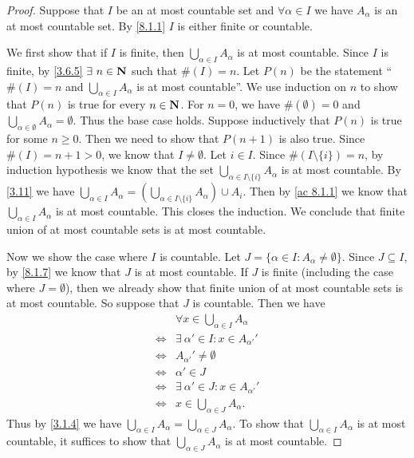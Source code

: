 \begin{proof}
  Suppose that \(I\) be an at most countable set and \(\forall \alpha \in I\) we have \(A_{\alpha}\) is an at most countable set.
  By \cref{8.1.1} \(I\) is either finite or countable.

  We first show that if \(I\) is finite, then \(\bigcup_{\alpha \in I} A_{\alpha}\) is at most countable.
  Since \(I\) is finite, by \cref{3.6.5} \(\exists\ n \in \mathbf{N}\) such that \(\#(I) = n\).
  Let \(P(n)\) be the statement ``\(\#(I) = n\) and \(\bigcup_{\alpha \in I} A_{\alpha}\) is at most countable''.
  We use induction on \(n\) to show that \(P(n)\) is true for every \(n \in \mathbf{N}\).
  For \(n = 0\), we have \(\#(\emptyset) = 0\) and \(\bigcup_{\alpha \in \emptyset} A_{\alpha} = \emptyset\).
  Thus the base case holds.
  Suppose inductively that \(P(n)\) is true for some \(n \geq 0\).
  Then we need to show that \(P(n + 1)\) is also true.
  Since \(\#(I) = n + 1 > 0\), we know that \(I \neq \emptyset\).
  Let \(i \in I\).
  Since \(\#(I \setminus \{i\}) = n\), by induction hypothesis we know that the set \(\bigcup_{\alpha \in I \setminus \{i\}} A_{\alpha}\) is at most countable.
  By \cref{3.11} we have \(\bigcup_{\alpha \in I} A_{\alpha} = (\bigcup_{\alpha \in I \setminus \{i\}} A_{\alpha}) \cup A_i\).
  Then by \cref{ac 8.1.1} we know that \(\bigcup_{\alpha \in I} A_{\alpha}\) is at most countable.
  This closes the induction.
  We conclude that finite union of at most countable sets is at most countable.

  Now we show the case where \(I\) is countable.
  Let \(J = \{\alpha \in I : A_{\alpha} \neq \emptyset\}\).
  Since \(J \subseteq I\), by \cref{8.1.7} we know that \(J\) is at most countable.
  If \(J\) is finite (including the case where \(J = \emptyset\)), then we already show that finite union of at most countable sets is at most countable.
  So suppose that \(J\) is countable.
  Then we have
  \begin{align*}
         & \forall x \in \bigcup_{\alpha \in I} A_{\alpha} \\
    \iff & \exists\ \alpha' \in I : x \in A_{\alpha'}'     \\
    \iff & A_{\alpha'}' \neq \emptyset                     \\
    \iff & \alpha' \in J                                   \\
    \iff & \exists\ \alpha' \in J : x \in A_{\alpha'}'     \\
    \iff & x \in \bigcup_{\alpha \in J} A_{\alpha}.
  \end{align*}
  Thus by \cref{3.1.4} we have \(\bigcup_{\alpha \in I} A_{\alpha} = \bigcup_{\alpha \in J} A_{\alpha}\).
  To show that \(\bigcup_{\alpha \in I} A_{\alpha}\) is at most countable, it suffices to show that \(\bigcup_{\alpha \in J} A_{\alpha}\) is at most countable.


\end{proof}
